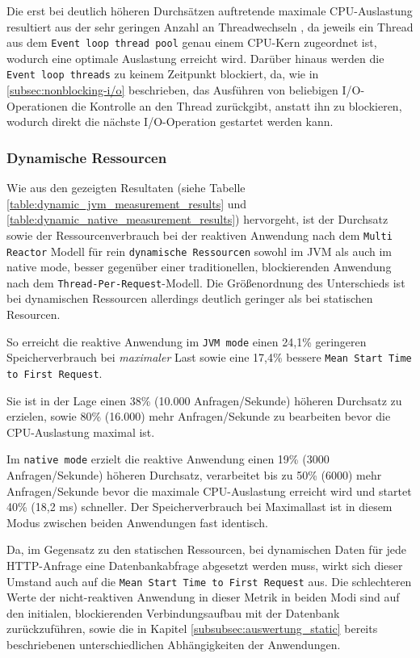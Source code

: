 Die erst bei deutlich höheren Durchsätzen auftretende maximale CPU-Auslastung resultiert aus der sehr geringen Anzahl an Threadwechseln
, da jeweils ein Thread aus dem \verb|Event loop thread pool| genau einem CPU-Kern zugeordnet ist, wodurch eine optimale Auslastung erreicht
wird. Darüber hinaus werden die \verb|Event loop threads| zu keinem Zeitpunkt blockiert, da, wie in \ref{subsec:nonblocking-i/o}
beschrieben, das Ausführen von beliebigen I/O-Operationen die Kontrolle an den Thread zurückgibt, anstatt ihn zu blockieren,
wodurch direkt die nächste I/O-Operation gestartet werden kann.
\subsubsection{Dynamische Ressourcen}
\label{subsubsec:auswertung_dynamic}
Wie aus den gezeigten Resultaten (siehe Tabelle \ref{table:dynamic_jvm_measurement_results} und
\ref{table:dynamic_native_measurement_results}) hervorgeht, ist der Durchsatz sowie der Ressourcenverbrauch bei der
reaktiven Anwendung nach dem \verb|Multi Reactor| Modell für rein \verb|dynamische Ressourcen| sowohl im JVM als auch im native mode,
besser gegenüber einer traditionellen, blockierenden Anwendung nach dem \verb|Thread-Per-Request|-Modell.
Die Größenordnung des Unterschieds ist bei dynamischen Ressourcen allerdings deutlich geringer als bei statischen Resourcen.

So erreicht die reaktive Anwendung im \verb|JVM mode| einen 24,1\% geringeren Speicherverbrauch bei \textit{maximaler} Last
sowie eine 17,4\% bessere \verb|Mean Start Time to First Request|.

Sie ist in der Lage einen 38\% (10.000 Anfragen/Sekunde) höheren Durchsatz zu erzielen,
sowie 80\% (16.000) mehr Anfragen/Sekunde zu bearbeiten bevor die CPU-Auslastung maximal ist.

Im \verb|native mode| erzielt die reaktive Anwendung einen 19\% (3000 Anfragen/Sekunde) höheren Durchsatz, verarbeitet bis zu
50\% (6000) mehr Anfragen/Sekunde bevor die maximale CPU-Auslastung erreicht wird und startet 40\% (18,2 ms) schneller.
Der Speicherverbrauch bei Maximallast ist in diesem Modus zwischen beiden Anwendungen fast identisch.

Da, im Gegensatz zu den statischen Ressourcen, bei dynamischen Daten für jede HTTP-Anfrage eine Datenbankabfrage abgesetzt werden
muss, wirkt sich dieser Umstand auch auf die \verb|Mean Start Time to First Request| aus.
Die schlechteren Werte der nicht-reaktiven Anwendung in dieser Metrik in beiden Modi sind auf den initialen, blockierenden
Verbindungsaufbau mit der Datenbank zurückzuführen, sowie die in Kapitel \ref{subsubsec:auswertung_static} bereits
beschriebenen unterschiedlichen Abhängigkeiten der Anwendungen.

